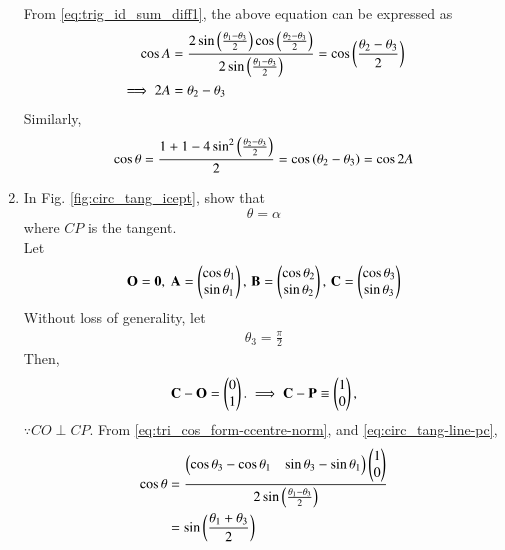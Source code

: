 \begin{enumerate}[label=\thesubsection.\arabic*.,ref=\thesubsection.\theenumi]
\begin{align}
  \end{align}
  From 
\eqref{eq:trig_id_sum_diff1}, the above equation can be expressed as
  \begin{align}
\cos A	   &= \frac{ 2\sin \left(\frac{\theta_1-\theta_3}{2}\right) \cos\left(\frac{\theta_2-\theta_3}{2}\right)}{ 2\sin\left(\frac{\theta_1-\theta_3}{2}\right)} = \cos\left(\frac{\theta_2-\theta_3}{2}\right)
\label{eq:tri_ccentre_subtend-temp}
	   \\
	   \implies 2A &= \theta_2-\theta_3
\label{eq:tri_ccentre_subtend}
  \end{align}
  Similarly, 
  \begin{align}
	  \cos \theta = \frac{1 + 1 - 4\sin^2\left(\frac{\theta_2-\theta_3}{2}\right)}{2} = \cos\left({\theta_2-\theta_3}\right)= \cos 2A
  \end{align}
\item
In Fig. \ref{fig:circ_tang_icept}, show that 
%
\begin{equation}
\theta = \alpha
		\label{fig:circ_tang_icept-equal}	
\end{equation}
%
\label{them:tang_icept_ang}
where $CP$ is the tangent.
\\
	\solution
    Let
  \begin{align}
	  \mathbf{O} = \mathbf{0},\
	  \mathbf{A} = \begin{pmatrix}\cos \theta_1 \\ \sin \theta_1\end{pmatrix},\,
	  \mathbf{B} =  \begin{pmatrix}\cos \theta_2 \\ \sin \theta_2\end{pmatrix},\,
	  \mathbf{C} =  \begin{pmatrix}\cos \theta_3 \\ \sin \theta_3\end{pmatrix}
  \end{align}
  Without loss of generality,  let 
  \begin{align}
	  \theta_3 = \frac{\pi}{2}
		\label{eq:circ_tang-line-t3}	
  \end{align}
  Then, 
  \begin{align}
	  \mathbf{C}-\mathbf{O} = \begin{pmatrix}0 \\ 1\end{pmatrix}.
\implies	  \mathbf{C}-\mathbf{P} \equiv \begin{pmatrix}1 \\ 0\end{pmatrix}
		\label{eq:circ_tang-line-pc},	
  \end{align}
  $\because CO \perp CP$.
From   
\eqref{eq:tri_cos_form-ccentre-norm},
and 
		\eqref{eq:circ_tang-line-pc},	
  \begin{align}
	  \cos \theta &= \frac{
		  \myvec{\cos \theta_3-\cos \theta_1 & \sin \theta_3-\sin \theta_1}
		  \myvec{1 \\ 0}
		  }
		  {
	   2 \sin \brak{\frac{\theta_1-\theta_3}{2}}
			  } 
			  \\
			  &=
	    \sin \brak{\frac{\theta_1+\theta_3}{2}}

\end{align}
\end{enumerate}
